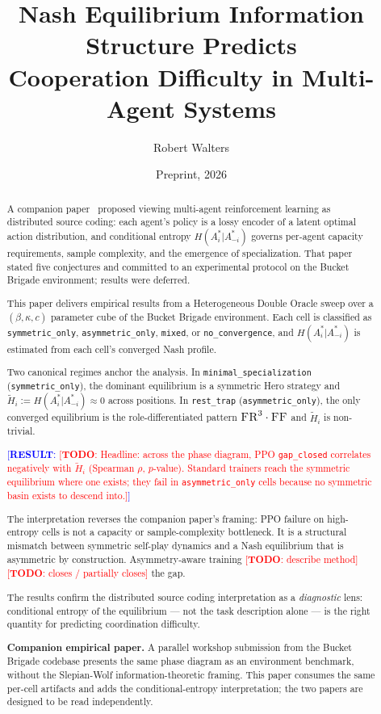 \documentclass{article}
\title{Nash Equilibrium Information Structure Predicts\\
       Cooperation Difficulty in Multi-Agent Systems}
\author{Robert Walters}
\date{Preprint, 2026}
\newcommand{\TODO}[1]{\textcolor{red}{[\textbf{TODO}: #1]}}
\newcommand{\RESULT}[1]{\textcolor{blue}{[\textbf{RESULT}: #1]}}
\begin{document}
\maketitle

\begin{abstract}
  A companion paper~\cite{walters2026slepianwolf} proposed viewing multi-agent
  reinforcement learning as distributed source coding: each agent's policy is a
  lossy encoder of a latent optimal action distribution, and conditional entropy
  $H(A_i^*|A_{-i}^*)$ governs per-agent capacity requirements, sample
  complexity, and the emergence of specialization.  That paper stated five
  conjectures and committed to an experimental protocol on the Bucket Brigade
  environment; results were deferred.

  This paper delivers empirical results from a Heterogeneous Double Oracle
  sweep over a $(\beta, \kappa, c)$ parameter cube of the Bucket Brigade
  environment.  Each cell is classified as \texttt{symmetric\_only},
  \texttt{asymmetric\_only}, \texttt{mixed}, or \texttt{no\_convergence}, and
  $H(A_i^*|A_{-i}^*)$ is estimated from each cell's converged Nash profile.

  Two canonical regimes anchor the analysis.  In \texttt{minimal\_specialization}
  (\texttt{symmetric\_only}), the dominant equilibrium is a symmetric Hero
  strategy and $\tilde{H}_i := H(A_i^*|A_{-i}^*) \approx 0$ across positions.
  In \texttt{rest\_trap} (\texttt{asymmetric\_only}), the only converged
  equilibrium is the role-differentiated pattern $\textsc{FR}^3 \cdot
  \textsc{FF}$ and $\tilde{H}_i$ is non-trivial.

  \RESULT{\TODO{Headline: across the phase diagram, PPO \texttt{gap\_closed}
  correlates negatively with $\tilde{H}_i$ (Spearman $\rho$, $p$-value).
  Standard trainers reach the symmetric equilibrium where one exists; they fail
  in \texttt{asymmetric\_only} cells because no symmetric basin exists to
  descend into.}}

  The interpretation reverses the companion paper's framing: PPO failure on
  high-entropy cells is not a capacity or sample-complexity bottleneck.  It is
  a structural mismatch between symmetric self-play dynamics and a Nash
  equilibrium that is asymmetric by construction.  Asymmetry-aware training
  \TODO{describe method} \TODO{closes / partially closes} the gap.

  The results confirm the distributed source coding interpretation as a
  \emph{diagnostic} lens: conditional entropy of the equilibrium — not the task
  description alone — is the right quantity for predicting coordination
  difficulty.

  \textbf{Companion empirical paper.}  A parallel workshop submission from the
  Bucket Brigade codebase presents the same phase diagram as an environment
  benchmark, without the Slepian-Wolf information-theoretic framing.  This
  paper consumes the same per-cell artifacts and adds the conditional-entropy
  interpretation; the two papers are designed to be read independently.
\end{abstract}
\end{document}

